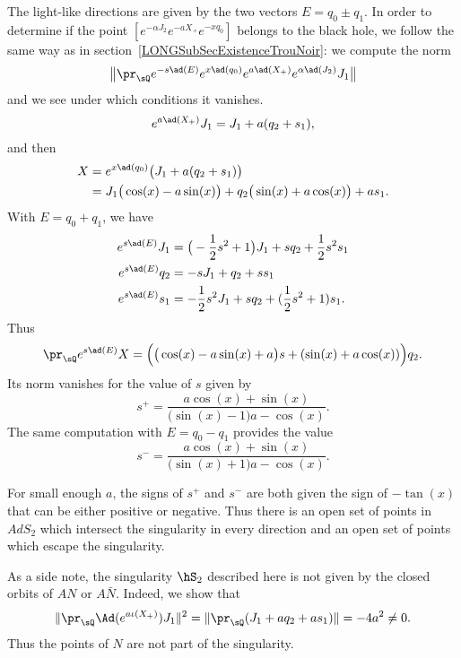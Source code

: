 The light-like directions are given by the two vectors $E=q_0\pm q_1$. In order to determine if the point $[e^{-\alpha J_2}e^{-aX_+} e^{-xq_0}]$ belongs to the black hole, we follow the same way as in section~\ref{LONGSubSecExistenceTrouNoir}: we compute the norm
\begin{equation}
	\big\| \pr_{\sQ}  e^{-s\ad(E)}e^{x\ad(q_0)} e^{a\ad(X_+)} e^{\alpha\ad(J_2)}J_1 \big\|
\end{equation}
and we see under which conditions it vanishes.
%
\begin{equation}
	e^{a\ad(X_+)}J_1=J_1+a(q_2+s_1),
\end{equation}
and then
\begin{equation}
	\begin{aligned}[]
		X & = e^{x\ad(q_0)}\big( J_1+a(q_2+s_1) \big)                              \\
		  & =J_1\big( \cos(x)-a\sin(x) \big)+q_2\big( \sin(x)+a\cos(x) \big)+as_1.
	\end{aligned}
\end{equation}
With $E=q_0+q_1$, we have
\begin{equation}
	\begin{aligned}[]
		e^{s\ad(E)}J_1 & =\big( -\frac{ 1 }{2}s^2+1 \big)J_1+sq_2+\frac{ 1 }{2}s^2s_1 \\
		e^{s\ad(E)}q_2 & =-sJ_1+q_2+ss_1                                              \\
		e^{s\ad(E)}s_1 & =-\frac{ 1 }{2}s^2J_1+sq_2+(\frac{ 1 }{2}s^2+1)s_1.
	\end{aligned}
\end{equation}
Thus
\begin{equation}
	\pr_{\sQ} e^{s\ad(E)}X=\Big( \big( \cos(x)-a\sin(x)+a \big)s+(\sin(x)+a\cos(x)) \Big)q_2.
\end{equation}
Its norm vanishes for the value of $s$ given by
\begin{equation}
	s^+=\frac{ a\cos(x)+\sin(x) }{ \big( \sin(x)-1 \big)a-\cos(x) }.
\end{equation}
The same computation with $E=q_0-q_1$ provides the value
\begin{equation}
	s^-=\frac{ a\cos(x)+\sin(x) }{ \big( \sin(x)+1 \big)a-\cos(x) }.
\end{equation}

For small enough $a$, the signs of $s^+$ and $s^-$ are both given the sign of $-\tan(x)$ that can be either positive or negative. Thus there is an open set of points in $AdS_2$ which intersect the singularity in every direction and an open set of points which escape the singularity.

As a side note, the singularity $\hS_2$ described here is not given by the closed orbits of $AN$ or $A\bar N$. Indeed, we show that
\begin{equation}
	\| \pr_{\sQ}\Ad( e^{a\iota(X_+)})J_1 \|^2=\| \pr_{\sQ}(J_1+aq_2+as_1) \|=-4a^2\neq 0.
\end{equation}
Thus the points of $N$ are not part of the singularity.
